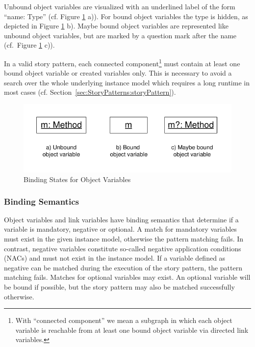 Unbound object variables are visualized with an underlined label of the form
``name: Type'' (cf. Figure \ref{fig:bindingStatesOverview} a)).
For bound object variables the type is hidden, as depicted
in Figure \ref{fig:bindingStatesOverview} b).
Maybe bound object variables are represented like unbound object variables, but
are marked by a question mark after the name (cf.\ Figure
\ref{fig:bindingStatesOverview} c)).

In a valid story pattern, each connected component\footnote{With
``connected component'' we mean a subgraph in which each object variable is
reachable from at least one bound object variable via directed link variables.}
must contain at least one bound object variable or created variables only. This
is necessary to avoid a search over the whole underlying instance model which requires a long runtime in most cases (cf. Section~\ref{sec:StoryPatterns:storyPattern}).

\begin{figure}[htb]
  \centering
  \includegraphics[scale=1.2]{figures/BindingStatesOverview}
  \caption{Binding States for Object Variables}
  \label{fig:bindingStatesOverview}
\end{figure}

\subsubsection{Binding Semantics}
\label{sec:StoryPatterns:binding:semantics}
Object variables and link variables have binding semantics that
determine if a variable is mandatory, negative or optional.
A match for mandatory variables must exist in the given instance model, otherwise
the pattern matching fails. 
In contrast, negative variables constitute so-called negative application
conditions (NACs) and must not exist in the instance model. If a variable defined as
negative can be matched during the execution of the story pattern, the pattern matching
fails. Matches for optional variables may exist. An optional variable will be
bound if possible, but the story pattern may also be matched
successfully otherwise.

